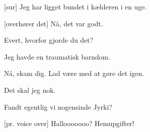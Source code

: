 \documentclass[a4paper,11pt]{article}
\begin{document}
\begin{sketch}
  [sur] Jeg har ligget bundet i kælderen i en uge.

  [overhører det] Nå, det var godt.

   Evert, hvorfor gjorde du det?

   Jeg havde en traumatisk barndom.

   Nå, skam dig. Lad være med at gøre det igen.

   Det skal jeg nok.

   Fandt egentlig vi nogensinde Jyrki?


  [pr. voice over] Hallooooooo? Hemupgifter!

\end{sketch}
\end{document}
